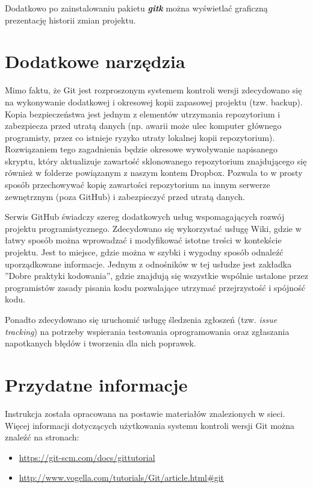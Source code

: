 Dodatkowo po zainstalowaniu pakietu \textit{\textbf{gitk}} można wyświetlać graficzną prezentację historii zmian projektu.

\section{Dodatkowe narzędzia}
	Mimo faktu, że Git jest rozproszonym systemem kontroli wersji zdecydowano się na wykonywanie dodatkowej i okresowej kopii zapasowej projektu (tzw. backup). Kopia bezpieczeństwa jest jednym z elementów utrzymania repozytorium i zabezpiecza przed utratą danych (np. awarii może ulec komputer głównego programisty, przez co istnieje ryzyko utraty lokalnej kopii repozytorium). Rozwiązaniem tego zagadnienia będzie okresowe wywoływanie napisanego skryptu, który aktualizuje zawartość sklonowanego repozytorium znajdującego się również w folderze powiązanym z naszym kontem Dropbox. Pozwala to w prosty sposób przechowywać kopię zawartości repozytorium na innym serwerze zewnętrznym (poza GitHub) i zabezpieczyć przed utratą danych.

Serwis GitHub świadczy szereg dodatkowych usług wspomagających rozwój projektu programistycznego. Zdecydowano się wykorzystać usługę Wiki, gdzie w łatwy sposób można wprowadzać i modyfikować istotne treści w kontekście projektu. Jest to miejsce, gdzie można w szybki i wygodny sposób odnaleźć uporządkowane informacje. Jednym z odnośników w tej usłudze jest zakładka ''Dobre praktyki kodowania'', gdzie znajdują się wszystkie wspólnie ustalone przez programistów zasady pisania kodu pozwalające utrzymać przejrzystość i spójność kodu.

	Ponadto zdecydowano się uruchomić usługę śledzenia zgłoszeń (tzw. \textit{issue tracking}) na potrzeby wspierania testowania oprogramowania oraz zgłaszania napotkanych błędów i tworzenia dla nich poprawek.

\section{Przydatne informacje}
Instrukcja została opracowana na postawie materiałów znalezionych w sieci. Więcej informacji dotyczących użytkowania systemu kontroli wersji Git można znaleźć na stronach:
\begin{itemize}
\item \url{https://git-scm.com/docs/gittutorial}
\item \url{http://www.vogella.com/tutorials/Git/article.html\#git}
\end{itemize}